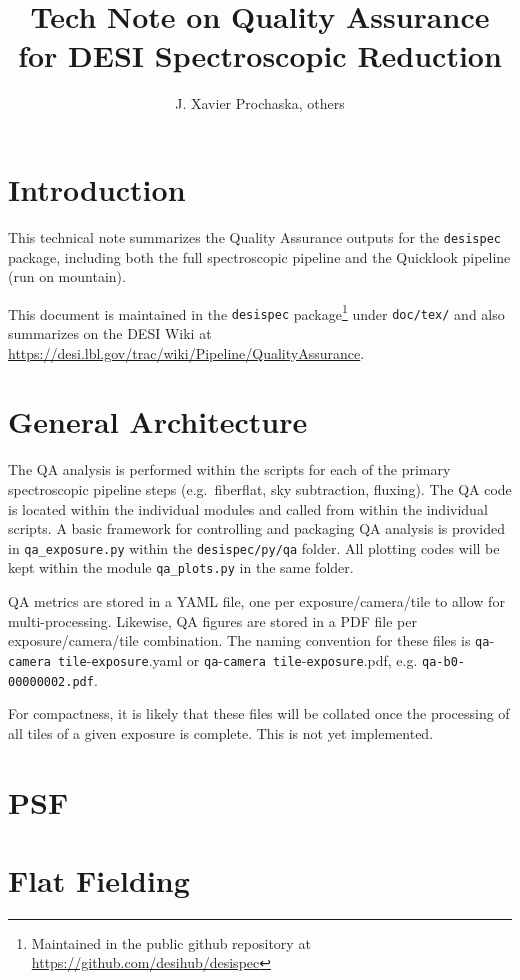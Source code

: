 \documentclass[12pt]{article}
\title{Tech Note on Quality Assurance for DESI Spectroscopic Reduction \\
\vspace{5mm}{\large\bf DESI-doc-XXX-v1}}
\author{J. Xavier Prochaska, others}
\begin{document}
\maketitle

\section{Introduction}

This technical note summarizes the Quality Assurance outputs for the
{\tt desispec} package, including both the full spectroscopic pipeline
and the Quicklook pipeline (run on mountain).

This document is maintained in the {\tt desispec} package\footnote{Maintained in the public github repository at \url{https://github.com/desihub/desispec}} under {\tt doc/tex/}
and also summarizes on the DESI Wiki at 
\url{https://desi.lbl.gov/trac/wiki/Pipeline/QualityAssurance}. 

\section{General Architecture}

The QA analysis is performed within the scripts for each
of the primary spectroscopic pipeline steps (e.g.\ fiberflat,
sky subtraction, fluxing).   The QA code is located within 
the individual modules and called from within the individual
scripts.  A basic framework for controlling and packaging
QA analysis is provided in {\tt qa\_exposure.py}
within the {\tt desispec/py/qa} folder.
All plotting codes will be kept within the module
{\tt qa\_plots.py} in the same folder.

QA metrics are stored
in a YAML file, one per exposure/camera/tile to allow for
multi-processing.  Likewise, QA figures are stored in a 
PDF file per exposure/camera/tile combination.
The naming convention for these files is 
{\tt qa}-{\tt camera tile}-{\tt exposure}.yaml or
{\tt qa}-{\tt camera tile}-{\tt exposure}.pdf, 
e.g. {\tt qa-b0-00000002.pdf}.

For compactness, it is likely that these files will be collated
once the processing of all tiles of a given exposure is complete.
This is not yet implemented.

\section{PSF}

\section{Flat Fielding}
\end{document}
